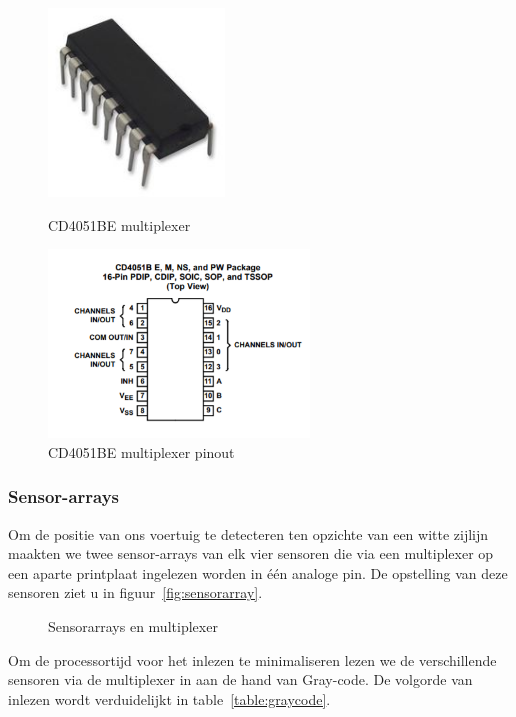 \documentclass[11pt,a4paper]{report}
\begin{document}
\begin{figure}[H]
	\centering
	\begin{minipage}[b]{0.4\textwidth}
		\includegraphics[height=5cm]{cd4051be.png}
		\caption{CD4051BE multiplexer}
		\label{fig:cd4051be}
	\end{minipage}
	\hfill
	\begin{minipage}[b]{0.4\textwidth}
		\includegraphics[height=5cm]{cd4051be_pinout.png}
		\caption{CD4051BE multiplexer pinout}
		\label{fig:cd4051be_pinout}
	\end{minipage}
\end{figure}

\subsubsection*{Sensor-arrays}
Om de positie van ons voertuig te detecteren ten opzichte van een witte zijlijn maakten we twee sensor-arrays van elk vier sensoren die via een multiplexer op een aparte printplaat ingelezen worden in \'e\'en analoge pin. De opstelling van deze sensoren ziet u in figuur~\vref{fig:sensorarray}.

\begin{figure}[H]
	\centering
	\caption{Sensorarrays en multiplexer\label{fig:sensorarray}}
\end{figure}

Om de processortijd voor het inlezen te minimaliseren lezen we de verschillende sensoren via de multiplexer in aan de hand van Gray-code. De volgorde van inlezen wordt verduidelijkt in table~\vref{table:graycode}.
\end{document}
